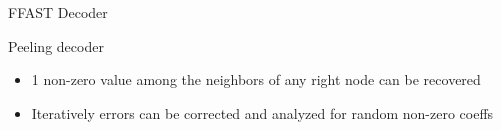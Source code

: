 \documentclass[10pt,xcolor=table]{beamer}
\begin{document}
	\begin{frame}{FFAST Decoder}
		
		
%			
%				
%			
			\vspace{-5pt}
			\begin{figure}[t]				
\resizebox{3.0in}{!}
{

}
			\end{figure}

		\begin{block}{Peeling decoder}
			\begin{itemize}
				\item 1 non-zero value among the neighbors of any right node can be recovered
								
				\item Iteratively errors can be corrected and analyzed for random non-zero coeffs
			\end{itemize}
		\end{block}
	\end{frame}	
\end{document}
